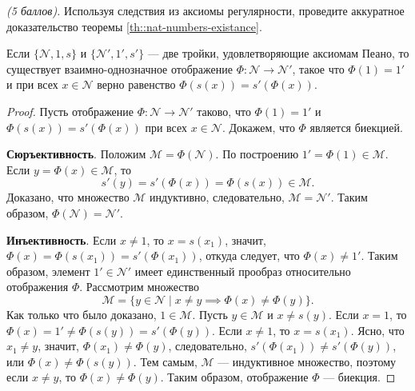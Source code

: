 \documentclass{article}
\begin{document}
\begin{?}
    \textit{(5 баллов).} Используя следствия из аксиомы регулярности, проведите аккуратное доказательство теоремы \ref{th::nat-numbers-existance}.
\end{?}
\begin{theorem}
    Если \(\{\mathcal{N}, 1, s\}\) и \(\{\mathcal{N}', 1', s'\}\) --- две тройки, удовлетворяющие аксиомам Пеано, то существует взаимно-однозначное отображение \(\Phi: \mathcal{N} \rightarrow \mathcal{N}'\), такое что \(\Phi(1) = 1'\) и при всех \(x \in \mathcal{N}\) верно равенство \(\Phi(s(x)) = s'( \Phi(x))\).    
\end{theorem}
\begin{proof}
    Пусть отображение \(\Phi: \mathcal{N} \rightarrow \mathcal{N}'\) таково, что \(\Phi(1) = 1'\) и \(\Phi(s(x)) = s'( \Phi(x))\) при всех \(x \in \mathcal{N}\). Докажем, что \(\Phi\) является биекцией. 
    
    \noindent \textbf{Сюръективность}. Положим \(\mathcal{M} = \Phi(\mathcal{N})\). По построению \(1' = \Phi(1) \in \mathcal{M}\). Если \(y = \Phi(x) \in \mathcal{M}\), то 
    \[
        s'(y) = s'( \Phi(x)) = \Phi(s(x)) \in \mathcal{M}.
    \] 
    Доказано, что множество \(\mathcal{M}\) индуктивно, следовательно, \(\mathcal{M} = \mathcal{N}'\). Таким образом, \(\Phi(\mathcal{N}) = \mathcal{N}'\).

    \noindent \textbf{Инъективность}. Если \(x \neq 1\), то \(x = s(x_1)\), значит, \(\Phi(x) = \Phi(s(x_1)) = s'( \Phi(x_1))\), откуда следует, что \(\Phi(x) \neq 1'\). Таким образом, элемент \(1' \in \mathcal{N}'\) имеет единственный прообраз относительно отображения \(\Phi\). Рассмотрим множество
    \[
        \mathcal{M} = \{y \in \mathcal{N} \mid x \neq y \implies \Phi(x) \neq \Phi(y)\}.
    \]
    Как только что было доказано, \(1 \in \mathcal{M}\). Пусть \(y \in \mathcal{M}\) и \(x \neq s(y)\). Если \(x = 1\), то \(\Phi(x) = 1' \neq \Phi(s(y)) = s'( \Phi(y))\). Если \(x \neq 1\), то \(x = s(x_1)\). Ясно, что \(x_1 \neq y\), значит, \(\Phi(x_1) \neq \Phi(y)\), следовательно, \(s'( \Phi(x_1)) \neq s'( \Phi(y))\), или \(\Phi(x) \neq \Phi(s(y))\). Тем самым, \(\mathcal{M}\) — индуктивное множество, поэтому если \(x \neq y\), то \(\Phi(x) \neq \Phi(y)\). Таким образом, отображение \(\Phi\) --- биекция.
    

\end{proof}
\end{document}
